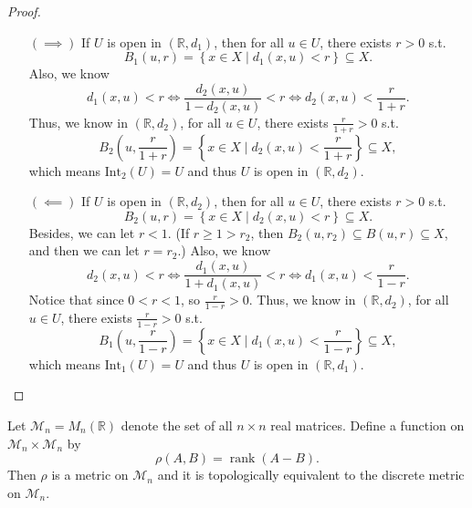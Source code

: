\begin{proof}
\begin{itemize}
      \begin{itemize}[itemsep=5pt plus 2pt, parsep=5pt plus 2pt]
        \item [\((\implies )\)] If \(U\) is open in \((\mathbb{R} , d_1)\), then for all \(u \in U\), there exists \(r > 0\) s.t. 
        \[
          B_1(u, r) = \left\{ x \in X \mid d_1(x, u) < r \right\} \subseteq X. 
        \]
        Also, we know 
        \[
          d_1(x, u) < r \iff \frac{d_2(x, u)}{1 - d_2(x, u)} < r \iff d_2(x, u) < \frac{r}{1+ r}.
        \]
        Thus, we know in \((\mathbb{R} , d_2)\), for all \(u \in U\), there exists \(\frac{r}{1+r} > 0\) s.t. 
        \[
          B_2 \left( u, \frac{r}{1+r} \right) = \left\{ x \in X \mid d_2(x,u) < \frac{r}{1+r} \right\} \subseteq X, 
        \] which means \(\mathrm{Int}_2(U) = U\) and thus \(U\) is open in \((\mathbb{R} , d_2)\).  
        \item [\((\impliedby )\) ] If \(U\) is open in \((\mathbb{R} , d_2)\), then for all \(u \in U\), there exists \(r > 0\) s.t. 
        \[
          B_2(u, r) = \left\{ x \in X \mid d_2(x, u) < r \right\} \subseteq X. 
        \] Besides, we can let \(r < 1\). (If \(r \ge 1 > r_2\), then \(B_2(u, r_2) \subseteq B(u, r) \subseteq X\), and then we can let \(r = r_2\).) 
        Also, we know 
        \[
          d_2(x, u) < r \iff \frac{d_1(x, u)}{1 + d_1(x, u)} < r \iff d_1(x, u) < \frac{r}{1 - r}.
        \]
        Notice that since \(0 < r < 1\), so \(\frac{r}{1 - r} > 0\).  
        Thus, we know in \((\mathbb{R} , d_2)\), for all \(u \in U\), there exists \(\frac{r}{1-r} > 0\) s.t. 
        \[
          B_1 \left( u, \frac{r}{1-r} \right) = \left\{ x \in X \mid d_1(x,u) < \frac{r}{1-r} \right\} \subseteq X, 
        \] which means \(\mathrm{Int}_1(U) = U\) and thus \(U\) is open in \((\mathbb{R} , d_1)\). 
      \end{itemize}
      
  \end{itemize}
\end{proof}
\begin{problem}[15 pts]
    Let $\mathcal{M}_n = M_n(\mathbb{R})$ denote the set of all $n \times n$ real matrices. Define a function on $\mathcal{M}_n \times \mathcal{M}_n$ by
\[
\rho(A,B) = \operatorname{rank}(A-B).
\]
Then $\rho$ is a metric on $\mathcal{M}_n$ and it is topologically equivalent to the discrete metric on $\mathcal{M}_n$.
\end{problem}
